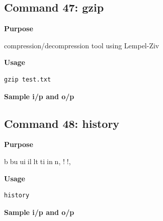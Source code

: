 \documentclass{article}
\begin{document}
\subsection{Command 47: gzip} 
\textbf{Purpose}
\begin{flushleft}
 compression/decompression tool using Lempel-Ziv
\end{flushleft}
\textbf{Usage}
\begin{verbatim}
gzip test.txt
\end{verbatim}
\textbf{Sample i/p and o/p}
\begin{figure}[H] 
\end{figure}
\subsection{Command 48: history} 
\textbf{Purpose}
\begin{flushleft}
     bbuuiillttiinn, !!, %
\end{flushleft}
\textbf{Usage}
\begin{verbatim}
history
\end{verbatim}
\textbf{Sample i/p and o/p}
\begin{figure}[H] 
\end{figure}
\end{document}
